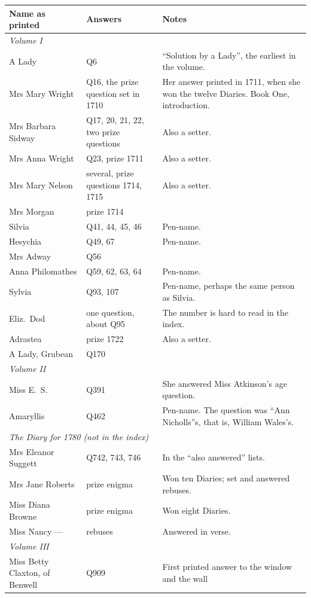 \documentclass[11pt,a4paper]{article}
\begin{document}
\begin{longtable}{p{4.2cm} p{3.8cm} p{7.2cm}}
\toprule
Name as printed & Answers & Notes\\
\midrule
\endhead
\multicolumn{3}{l}{\textit{Volume I}}\\
A Lady & Q6 & ``Solution by a Lady'', the earliest in the volume.\\
Mrs Mary Wright & Q16, the prize question set in 1710 & Her answer printed in 1711, when she won the twelve Diaries. Book One, introduction.\\
Mrs Barbara Sidway & Q17, 20, 21, 22, two prize questions & Also a setter.\\
Mrs Anna Wright & Q23, prize 1711 & Also a setter.\\
Mrs Mary Nelson & several, prize questions 1714, 1715 & Also a setter.\\
Mrs Morgan & prize 1714 &\\
Silvia & Q41, 44, 45, 46 & Pen-name.\\
Hesychia & Q49, 67 & Pen-name.\\
Mrs Adway & Q56 &\\
Anna Philomathes & Q59, 62, 63, 64 & Pen-name.\\
Sylvia & Q93, 107 & Pen-name, perhaps the same person as Silvia.\\
Eliz.\ Dod & one question, about Q95 & The number is hard to read in the index.\\
Adrastea & prize 1722 & Also a setter.\\
A Lady, Grubean & Q170 &\\[4pt]
\multicolumn{3}{l}{\textit{Volume II}}\\
Miss E.~S. & Q391 & She answered Miss Atkinson's age question.\\
Amaryllis & Q462 & Pen-name. The question was ``Ann Nicholls''s, that is, William
  Wales's.\\[4pt]
\multicolumn{3}{l}{\textit{The Diary for 1780 (not in the index)}}\\
Mrs Eleanor Suggett & Q742, 743, 746 & In the ``also answered'' lists.\\
Mrs Jane Roberts & prize enigma & Won ten Diaries; set and answered rebuses.\\
Miss Diana Browne & prize enigma & Won eight Diaries.\\
Miss Nancy --- & rebuses & Answered in verse.\\[4pt]
\multicolumn{3}{l}{\textit{Volume III}}\\
Miss Betty Claxton, of Benwell & Q909 & First printed answer to the window and the wall

\end{longtable}
\end{document}
